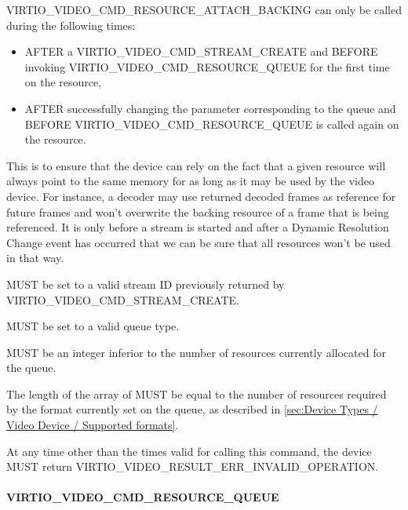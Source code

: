 VIRTIO_VIDEO_CMD_RESOURCE_ATTACH_BACKING can only be called during
the following times:

\begin{itemize}
\item
  AFTER a VIRTIO_VIDEO_CMD_STREAM_CREATE and BEFORE invoking
  VIRTIO_VIDEO_CMD_RESOURCE_QUEUE for the first time on the
  resource,
\item
  AFTER successfully changing the 
  parameter corresponding to the queue and BEFORE
  VIRTIO_VIDEO_CMD_RESOURCE_QUEUE is called again on the resource.
\end{itemize}

This is to ensure that the device can rely on the fact that a given
resource will always point to the same memory for as long as it may be
used by the video device. For instance, a decoder may use returned
decoded frames as reference for future frames and won't overwrite the
backing resource of a frame that is being referenced. It is only before
a stream is started and after a Dynamic Resolution Change event has
occurred that we can be sure that all resources won't be used in that
way.


 MUST be set to a valid stream ID previously returned
by VIRTIO_VIDEO_CMD_STREAM_CREATE.

 MUST be set to a valid queue type.

 MUST be an integer inferior to the number of
resources currently allocated for the queue.

The length of the  array of
 MUST be equal to the
number of resources required by the format currently set on the queue,
as described in
\ref{sec:Device Types / Video Device / Supported formats}.


At any time other than the times valid for calling this command, the
device MUST return VIRTIO_VIDEO_RESULT_ERR_INVALID_OPERATION.

\paragraph{VIRTIO_VIDEO_CMD_RESOURCE_QUEUE}\label{sec:Device Types / Video Device / Device Operation / Device Operation: Resource Commands / VIRTIO_VIDEO_CMD_RESOURCE_QUEUE}


